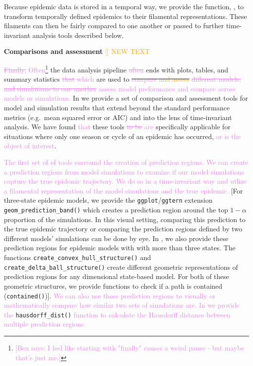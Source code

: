 \documentclass[
  shortnames]{jss}
\begin{document}
Because epidemic data is stored in a temporal way, we provide the
function, , to transform temporally defined
epidemics to their filamental representations. These filaments can then
be fairly compared to one another or passed to further time-invariant
analysis tools described below.

\textbf{Comparisons and assessment} \textcolor{orange}{[[ NEW TEXT}

\textcolor{violet}{\sout{Finally,} Often}\footnote{\textcolor{violet}{[Ben says: I feel like starting with "finally" causes a weird pause - but maybe that's just me.]}}
the data analysis pipeline \textcolor{violet}{\sout{often}} ends with
plots, tables, and summary statistics
\textcolor{violet}{\sout{that} which} are used to
\sout{\textcolor{violet}{compare} \textcolor{orange}{and assess}}
\textcolor{violet}{\sout{different models, and simulations to one another} assess model preformance and compare across models or simulations.}
In  we provide a set of comparison and assessment tools
for model and simulation results that extend beyond the standard
performance metrics (e.g.~mean squared error or AIC) and into the lens
of time-invariant analysis. We have found \textcolor{violet}{that} these
tools \textcolor{violet}{\sout{to be} are} specifically applicable for
situations where only one season or cycle of an epidemic has occurred,
\textcolor{violet}{or is the object of interest}.

\textcolor{violet}{The first set of of tools surround the creation of prediction regions. We can create a prediction regions from model simulations to examine if our model simulations capture the true epidemic trajectory. We do so in a time-invariant way and utlize a filamental representation of the model simulations and the true epidemic.}
{[}For three-state epidemic models, we provide the
\texttt{ggplot}/\texttt{ggtern} extension
\texttt{geom\_prediction\_band()} which creates a prediction region
around the top \(1-\alpha\) proportion of the simulations. In this
visual setting, comparing this prediction to the true epidemic
trajectory or comparing the prediction regions defined by two different
models' simulations can be done by eye. In , we also
provide these prediction regions for epidemic models with with more than
three states. The functions \texttt{create\_convex\_hull\_structure()}
and \texttt{create\_delta\_ball\_structure()} create different geometric
representations of prediction regions for any dimensional state-based
model. For both of these geometric structures, we provide functions to
check if a path is contained (\texttt{contained()}){]}.
\textcolor{violet}{We can also use these prediction regions to visually or mathematically compare how similar two sets of simulations are. In  we provide the}
\texttt{hausdorff\_dist()}
\textcolor{violet}{function to calculate the Hausdorff distance between multiple prediction regions.}
\end{document}
